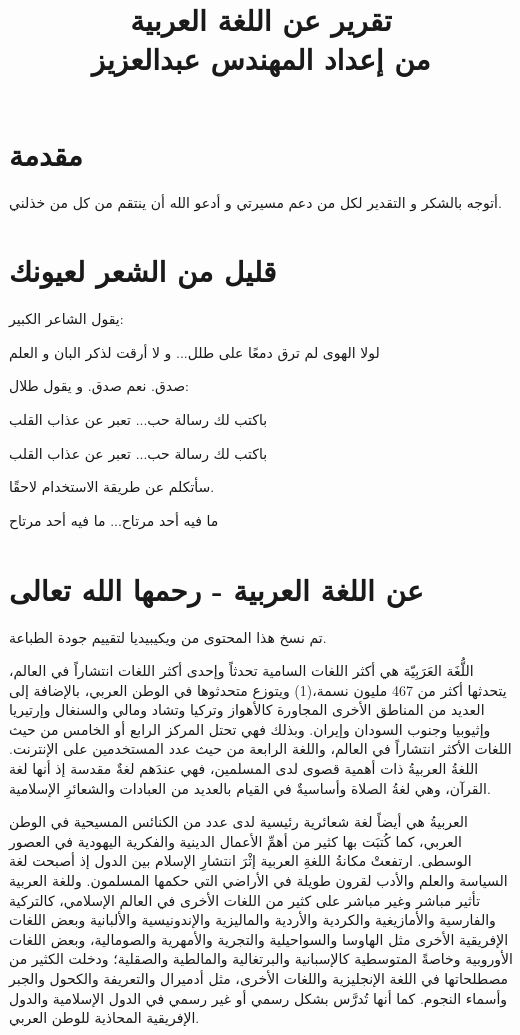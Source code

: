 \documentclass[12pt]{article}
\title{تقرير عن اللغة العربية \\
\large  من إعداد المهندس عبدالعزيز}
\begin{document}
\maketitle
\tableofcontents


\section*{مقدمة}
أتوجه بالشكر و التقدير لكل من دعم مسيرتي و أدعو الله أن ينتقم من كل من خذلني.


\section{قليل من الشعر لعيونك}

يقول الشاعر الكبير:


لولا الهوى لم ترق دمعًا على طلل... و لا أرقت لذكر البان و العلم


صدق. نعم صدق. و يقول طلال:


باكتب لك رسالة حب... تعبر عن عذاب القلب

باكتب لك رسالة حب... تعبر عن عذاب القلب


سأتكلم عن طريقة الاستخدام لاحقًا.


ما فيه أحد مرتاح... ما فيه أحد مرتاح

\section{عن اللغة العربية - رحمها الله تعالى}

تم نسخ هذا المحتوى من ويكيبيديا لتقييم جودة الطباعة.

اللُّغَة العَرَبِيّة هي أكثر اللغات السامية تحدثاً وإحدى أكثر اللغات انتشاراً في العالم، يتحدثها أكثر من 467 مليون نسمة،(1) ويتوزع متحدثوها في الوطن العربي، بالإضافة إلى العديد من المناطق الأخرى المجاورة كالأهواز وتركيا وتشاد ومالي والسنغال وإرتيريا وإثيوبيا وجنوب السودان وإيران. وبذلك فهي تحتل المركز الرابع أو الخامس من حيث اللغات الأكثر انتشاراً في العالم، واللغة الرابعة من حيث عدد المستخدمين على الإنترنت. اللغةُ العربيةُ ذات أهمية قصوى لدى المسلمين، فهي عندَهم لغةٌ مقدسة إذ أنها لغة القرآن، وهي لغةُ الصلاة وأساسيةٌ في القيام بالعديد من العبادات والشعائرِ الإسلامية.

العربيةُ هي أيضاً لغة شعائرية رئيسية لدى عدد من الكنائس المسيحية في الوطن العربي، كما كُتبَت بها كثير من أهمِّ الأعمال الدينية والفكرية اليهودية في العصور الوسطى. ارتفعتْ مكانةُ اللغةِ العربية إثْرَ انتشارِ الإسلام بين الدول إذ أصبحت لغة السياسة والعلم والأدب لقرون طويلة في الأراضي التي حكمها المسلمون. وللغة العربية تأثير مباشر وغير مباشر على كثير من اللغات الأخرى في العالم الإسلامي، كالتركية والفارسية والأمازيغية والكردية والأردية والماليزية والإندونيسية والألبانية وبعض اللغات الإفريقية الأخرى مثل الهاوسا والسواحيلية والتجرية والأمهرية والصومالية، وبعض اللغات الأوروبية وخاصةً المتوسطية كالإسبانية والبرتغالية والمالطية والصقلية؛ ودخلت الكثير من مصطلحاتها في اللغة الإنجليزية واللغات الأخرى، مثل أدميرال والتعريفة والكحول والجبر وأسماء النجوم. كما أنها تُدرَّس بشكل رسمي أو غير رسمي في الدول الإسلامية والدول الإفريقية المحاذية للوطن العربي.
\end{document}
